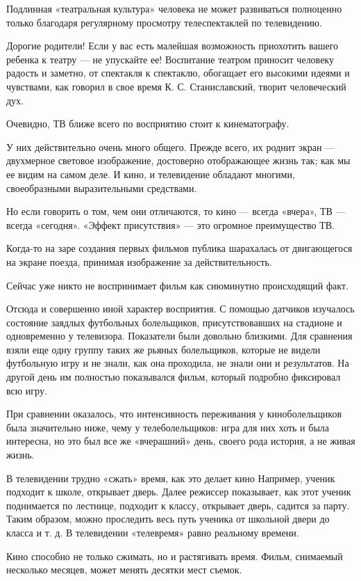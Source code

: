 \documentclass[12pt, a4paper, openany]{book}
\begin{document}
Подлинная «театральная культура» человека не может развиваться полноценно только благодаря регулярному просмотру телеспектаклей по телевидению. 

Дорогие родители! Если у вас есть малейшая возможность приохотить вашего ребенка к театру — не упускайте ее! Воспитание театром приносит человеку радость и заметно, от спектакля к спектаклю, обогащает его высокими идеями и чувствами, как говорил в свое время К. С. Станиславский, творит человеческий дух. 

Очевидно, ТВ ближе всего по восприятию стоит к кинематографу. 

У них действительно очень много общего. Прежде всего, их роднит экран — двухмерное световое изображение, достоверно отображающее жизнь так; как мы ее видим на самом деле. И кино, и телевидение обладают многими, своеобразными выразительными средствами. 

Но если говорить о том, чем они отличаются, то кино — всегда «вчера», ТВ — всегда «сегодня». «Эффект присутствия» — это огромное преимущество ТВ. 

Когда-то на заре создания первых фильмов публика шарахалась от двигающегося на экране поезда, принимая изображение за действительность. 

Сейчас уже никто не воспринимает фильм как сиюминутно происходящий факт. 

Отсюда и совершенно иной характер восприятия. С помощью датчиков изучалось состояние заядлых футбольных болельщиков, присутствовавших на стадионе и одновременно у телевизора. Показатели были довольно близкими. Для сравнения взяли еще одну группу таких же рьяных болельщиков, которые не видели футбольную игру и не знали, как она проходила, не знали они и результатов. На другой день им полностью показывался фильм, который подробно фиксировал всю игру. 

При сравнении оказалось, что интенсивность переживания у киноболельщиков была значительно ниже, чему у телеболельщиков: игра для них хоть и была интересна, но это был все же «вчерашний» день, своего рода история, а не живая жизнь. 

В телевидении трудно «сжать» время, как это делает кино Например, ученик подходит к школе, открывает дверь. Далее режиссер показывает, как этот ученик поднимается по лестнице, подходит к классу, открывает дверь, садится за парту. Таким образом, можно проследить весь путь ученика от школьной двери до класса и т. д. В телевидении «телевремя» равно реальному времени. 

Кино способно не только сжимать, но и растягивать время. Фильм, снимаемый несколько месяцев, может менять десятки мест съемок. 
\end{document}
